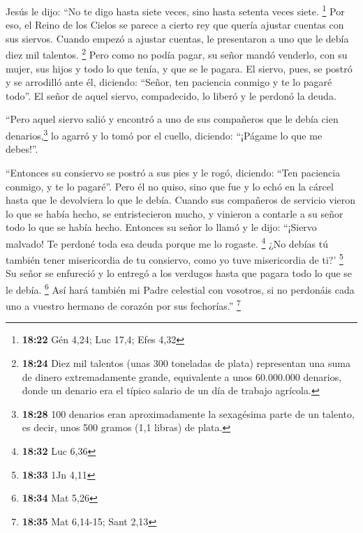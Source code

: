 \begin{paracol}{2}
 Jesús le dijo: ``No te digo hasta siete veces, sino
hasta setenta veces siete. \footnote{\textbf{18:22} Gén 4,24; Luc 17,4;
  Efes 4,32}  Por eso, el Reino de los Cielos se parece a
cierto rey que quería ajustar cuentas con sus siervos. 
Cuando empezó a ajustar cuentas, le presentaron a uno que le debía diez
mil talentos. \footnote{\textbf{18:24} Diez mil talentos (unas 300
  toneladas de plata) representan una suma de dinero extremadamente
  grande, equivalente a unos 60.000.000 denarios, donde un denario era
  el típico salario de un día de trabajo agrícola.}  Pero
como no podía pagar, su señor mandó venderlo, con su mujer, sus hijos y
todo lo que tenía, y que se le pagara.  El siervo, pues,
se postró y se arrodilló ante él, diciendo: ``Señor, ten paciencia
conmigo y te lo pagaré todo''.  El señor de aquel siervo,
compadecido, lo liberó y le perdonó la deuda.

 ``Pero aquel siervo salió y encontró a uno de sus
compañeros que le debía cien denarios,\footnote{\textbf{18:28} 100
  denarios eran aproximadamente la sexagésima parte de un talento, es
  decir, unos 500 gramos (1,1 libras) de plata.} lo agarró y lo tomó por
el cuello, diciendo: ``¡Págame lo que me debes!''.

 ``Entonces su consiervo se postró a sus pies y le rogó,
diciendo: ``Ten paciencia conmigo, y te lo pagaré''. 
Pero él no quiso, sino que fue y lo echó en la cárcel hasta que le
devolviera lo que le debía.  Cuando sus compañeros de
servicio vieron lo que se había hecho, se entristecieron mucho, y
vinieron a contarle a su señor todo lo que se había hecho.
 Entonces su señor lo llamó y le dijo: ``¡Siervo malvado!
Te perdoné toda esa deuda porque me lo rogaste. \footnote{\textbf{18:32}
  Luc 6,36}  ¿No debías tú también tener misericordia de
tu consiervo, como yo tuve misericordia de ti?' \footnote{\textbf{18:33}
  1Jn 4,11}  Su señor se enfureció y lo entregó a los
verdugos hasta que pagara todo lo que se le debía. \footnote{\textbf{18:34}
  Mat 5,26}  Así hará también mi Padre celestial con
vosotros, si no perdonáis cada uno a vuestro hermano de corazón por sus
fechorías.'' \footnote{\textbf{18:35} Mat 6,14-15; Sant 2,13}

\switchcolumn
\begin{otherlanguage}{english}

\hypertarget{controversy-between-disciples-jesus-exhortation-to-humility}{%
}
\end{otherlanguage}
\end{paracol}
